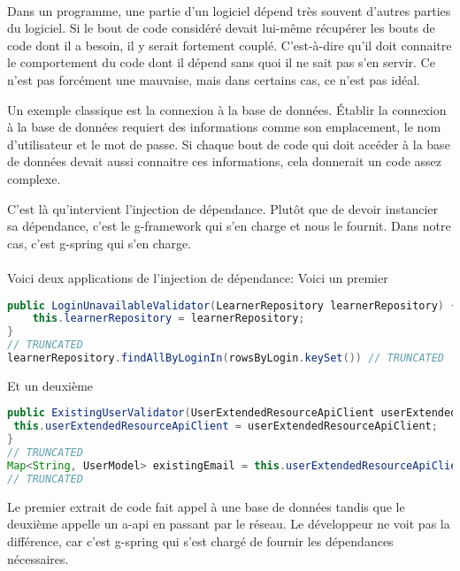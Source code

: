 \paragraph{}
Dans un programme, une partie d'un logiciel dépend très souvent d'autres parties du logiciel.
Si le bout de code considéré devait lui-même récupérer les bouts de code dont il a besoin, il y serait fortement couplé.
C'est-à-dire qu'il doit connaitre le comportement du code dont il dépend sans quoi il ne sait pas s'en servir.
Ce n'est pas forcément une mauvaise, mais dans certains cas, ce n'est pas idéal.

Un exemple classique est la connexion à la base de données.
Établir la connexion à la base de données requiert des informations comme son emplacement, le nom d'utilisateur et le mot de passe.
Si chaque bout de code qui doit accéder à la base de données devait aussi connaitre ces informations, cela donnerait un code assez complexe.

C'est là qu'intervient l'injection de dépendance.
Plutôt que de devoir instancier\fnmark{} sa dépendance, c'est le \gls{g-framework} qui s'en charge et nous le fournit.
Dans notre cas, c'est \Gls{g-spring} qui s'en charge.

\paragraph{}
Voici deux applications de l'injection de dépendance:
Voici un premier
\begin{lstlisting}[language=Java]
public LoginUnavailableValidator(LearnerRepository learnerRepository) {
    this.learnerRepository = learnerRepository;
}
// TRUNCATED
learnerRepository.findAllByLoginIn(rowsByLogin.keySet()) // TRUNCATED
\end{lstlisting}
Et un deuxième
\begin{lstlisting}[language=Java]
public ExistingUserValidator(UserExtendedResourceApiClient userExtendedResourceApiClient) {
 this.userExtendedResourceApiClient = userExtendedResourceApiClient;
}
// TRUNCATED
Map<String, UserModel> existingEmail = this.userExtendedResourceApiClient.getUserByLoginMapUsingPOST(emails).getBody();
// TRUNCATED
\end{lstlisting}
Le premier extrait de code fait appel à une base de données tandis que le deuxième appelle un \gls{a-api} en passant par le réseau.
Le développeur ne voit pas la différence, car c'est \Gls{g-spring} qui s'est chargé de fournir les dépendances nécessaires.

